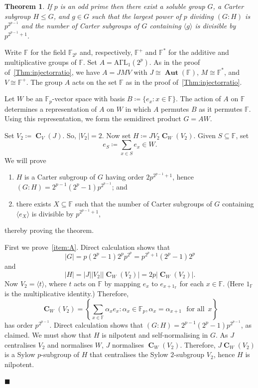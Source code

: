 \documentclass[10pt,a4paper]{amsart}
\numberwithin{equation}{section}
\DeclareMathOperator{\cent}{\mathbf{C}}
\DeclareMathOperator{\aut}{\mathbf{Aut}}
\renewcommand{\leq}{\leqslant}
\newenvironment{proofof}{{\bf {Proof.} }}{\hfill $\blacksquare$ \\}
\def\ff{{\mathbb F}}
\newtheorem{prevtheorem}{Theorem}
\begin{document}
\begin{prevtheorem}\label{Thm:CountrexampleDivisibilityCart}
If $p$ is an odd prime then there exist a soluble group $G$, 
a Carter subgroup $H \leq G$, and $g \in G$ 
such that the largest power of $p$ dividing $(G : H)$ is $p^{2^{p-1}}$ and the number of Carter subgroups of $G$ containing $\langle g \rangle$ is divisible by $p^{2^{p-1}+1}$.
\end{prevtheorem}

\begin{proofof}
Write $\ff$ for the field $\ff_{2^p}$ and, respectively, 
$\ff^+$ and $\ff^\ast$ for the additive and multiplicative groups of $\ff$.  
Set $A = \mathrm{A\Gamma L}_1(2^p)$.  
As in the proof of~\autoref{Thm:injectorratio}, we have $A = JMV$ with 
$J \cong \aut(\ff)$, $M \cong \ff^\ast$, and $V \cong \ff^+$.  
The group $A$ acts on the set $\ff$ as in the proof of~\autoref{Thm:injectorratio}.

Let $W$ be an $\ff_p$-vector space with basis $B \coloneqq \{e_x : x \in \ff\}$.  
The action of $A$ on $\ff$ determines a representation of $A$ on $W$ 
in which $A$ permutes $B$ as it permutes $\ff$.  
Using this representation, we form the semidirect product $G = AW$.  

Set $V_2 \coloneqq \cent_V(J)$.  
So, $|V_2| = 2$.  
Now set $H \coloneqq J V_2 \cent_W(V_2)$.  
Given $S \subseteq \ff$, set
\[
e_S \coloneqq \sum_{x \in S}e_x \in W.
\]
We will prove 
\begin{enumerate}[label={\upshape(\Alph*)}]
\item\label{item:A} $H$ is a Carter subgroup of $G$ having order $2p^{2^{p-1}+1}$, hence $(G : H) = 2^{p-1}(2^p-1)p^{2^{p-1}}$; and
\item\label{item:B} there exists $X \subseteq \ff$ such that 
the number of Carter subgroups of $G$ containing $\langle e_X \rangle$ 
is divisible by $p^{2^{p-1}+1}$,
\end{enumerate}
thereby proving the theorem.

First we prove~\ref{item:A}.  
Direct calculation shows that
\begin{equation}\label{Eq:gorder}
|G| = p(2^p-1)2^pp^{2^p}=p^{2^p+1}(2^p-1)2^p
\end{equation}
and 
\begin{equation}\label{Eq:horder}
|H| = |J||V_2||\cent_W(V_2)| = 2p|\cent_W(V_2)|.
\end{equation}
Now $V_2=\langle t \rangle$, where $t$ acts on $\ff$ by mapping $e_x$ to $e_{x+1_\ff}$ for each $x \in \ff$.  
(Here $1_\ff$ is the multiplicative identity.)  
Therefore,
\[
\cent_W(V_2) = 
\left\{\sum_{x \in \ff}\alpha_xe_x : \alpha_x \in \ff_p, \alpha_x = \alpha_{x+1}\,\, \mbox{ for all }\, x \right\}
\]
has order $p^{2^{p-1}}$.  
Direct calculation shows that $(G : H) = 2^{p-1}(2^p-1)p^{2^{p-1}}$, as claimed.  
We must show that $H$ is nilpotent and self-normalising in $G$.  
As $J$ centralises $V_2$ and normalises $W$, 
$J$ normalises $\cent_W(V_2)$.  
Therefore, $J \cent_W(V_2)$ is a Sylow $p$-subgroup of $H$ 
that centralises the Sylow $2$-subgroup $V_2$, hence $H$ is nilpotent.  


\end{proofof}
\end{document}
